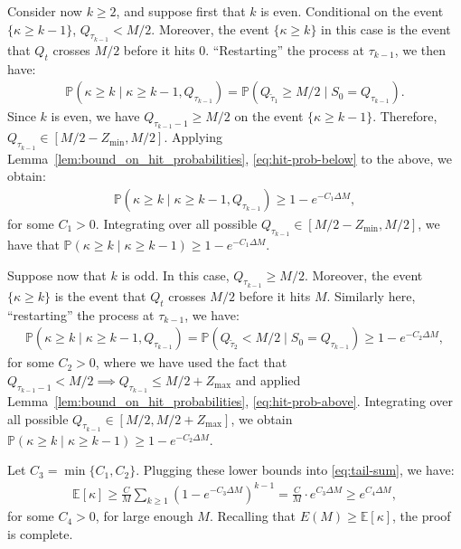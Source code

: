 \documentclass[mnsc,nonblindrev]{informs3}
\newcommand{\E}{\mathbb{E}}
\newcommand{\pr}{\mathbb{P}}
\renewcommand{\Pr}{\pr}
\newcommand{\Ttaulow}{\widetilde{\tau}_1}
\newcommand{\Ttauhigh}{\widetilde{\tau}_2}
\renewenvironment{proof}[1][Proof]{%
  \par\noindent{\itshape #1.} \ignorespaces
}{%
  \hfill\Halmos\par
}
\begin{document}
\begin{proof}[Proof]
Consider now $k \geq 2$, and suppose first that $k$ is even. Conditional on the event $\{\kappa \geq k-1\}$, $Q_{\tau_{k-1}} < M/2$. Moreover, the event $\{\kappa \geq k\}$ in this case is the event that $Q_t$ crosses $M/2$ before it hits 0. ``Restarting'' the process at $\tau_{k-1}$, we then have:
\begin{align*}
\Pr(\kappa \geq k \mid \kappa \geq k-1, Q_{\tau_{k-1}}) = \Pr\left({Q}_{\Ttaulow} \geq M/2 \mid S_0 = Q_{\tau_{k-1}}\right).
\end{align*}
Since $k$ is even, we have $Q_{\tau_{k-1}-1} \geq M/2$ on the event $\{\kappa \geq k-1\}$. Therefore, $Q_{\tau_{k-1}} \in [M/2-Z_{\min},M/2]$. Applying Lemma~\ref{lem:bound_on_hit_probabilities},  \cref{eq:hit-prob-below} to the above, we obtain:
\begin{align*}
\Pr(\kappa \geq k \mid \kappa \geq k-1, Q_{\tau_{k-1}}) \geq 1-e^{-C_1\Delta M},
\end{align*}
for some $C_1 > 0$. Integrating over all possible $Q_{\tau_{k-1}} \in [M/2-Z_{\min},M/2]$, we have that $\Pr(\kappa \geq k \mid \kappa \geq k-1) \geq 1-e^{-C_1\Delta M}$.

Suppose now that $k$ is odd. In this case, $Q_{\tau_{k-1}} \geq M/2$. Moreover, the event $\{\kappa \geq k\}$ is the event that $Q_t$ crosses $M/2$ before it hits $M$. Similarly here, ``restarting'' the process at $\tau_{k-1}$, we have:
\begin{align*}
\Pr(\kappa \geq k \mid \kappa \geq k-1, Q_{\tau_{k-1}}) = \Pr\left({Q}_{\Ttauhigh} < M/2 \mid S_0 = Q_{\tau_{k-1}}\right) \geq 1-e^{-C_2\Delta M},
\end{align*}
for some $C_2 > 0$, where we have used the fact that $Q_{\tau_{k-1}-1} < M/2 \implies Q_{\tau_{k-1}} \leq M/2+Z_{\max}$ and applied Lemma~\ref{lem:bound_on_hit_probabilities},  \cref{eq:hit-prob-above}. Integrating over all possible $Q_{\tau_{k-1}} \in [M/2,M/2+Z_{\max}]$, we obtain \mbox{$\Pr(\kappa \geq k \mid \kappa \geq k-1) \geq 1-e^{-C_2\Delta M}$}. 

Let $C_3 = \min\{C_1, C_2\}$. Plugging these lower bounds into \eqref{eq:tail-sum}, we have:
\begin{align*}
\E[\kappa] \geq \frac{C}{M}\sum_{k\geq 1}\left(1-e^{-C_3\Delta M}\right)^{k-1} = \frac{C}{M}\cdot e^{C_3\Delta M} \geq e^{C_4\Delta M},
\end{align*}
for some $C_4 > 0$, for large enough $M$. Recalling that $E(M) \geq \E[\kappa]$, the proof is complete.
\end{proof}
\end{document}
